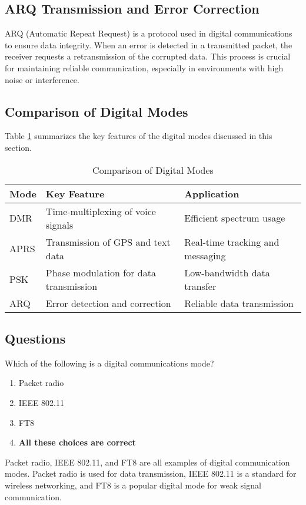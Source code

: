 \subsection*{ARQ Transmission and Error Correction}
ARQ (Automatic Repeat Request) is a protocol used in digital communications to ensure data integrity. When an error is detected in a transmitted packet, the receiver requests a retransmission of the corrupted data. This process is crucial for maintaining reliable communication, especially in environments with high noise or interference.

\subsection*{Comparison of Digital Modes}
Table \ref{tab:digital_modes} summarizes the key features of the digital modes discussed in this section.

\begin{table}[h]
    \centering
    \caption{Comparison of Digital Modes}
    \label{tab:digital_modes}
    \begin{tabular}{|l|l|l|}
        \hline
        \textbf{Mode} & \textbf{Key Feature} & \textbf{Application} \\
        \hline
        DMR & Time-multiplexing of voice signals & Efficient spectrum usage \\
        APRS & Transmission of GPS and text data & Real-time tracking and messaging \\
        PSK & Phase modulation for data transmission & Low-bandwidth data transfer \\
        ARQ & Error detection and correction & Reliable data transmission \\
        \hline
    \end{tabular}
\end{table}

\subsection*{Questions}
\begin{tcolorbox}[colback=gray!10!white,colframe=black!75!black,title={T8D01}]
    Which of the following is a digital communications mode?
    \begin{enumerate}[label=\Alph*),noitemsep]
        \item Packet radio
        \item IEEE 802.11
        \item FT8
        \item \textbf{All these choices are correct}
    \end{enumerate}
\end{tcolorbox}
Packet radio, IEEE 802.11, and FT8 are all examples of digital communication modes. Packet radio is used for data transmission, IEEE 802.11 is a standard for wireless networking, and FT8 is a popular digital mode for weak signal communication.

